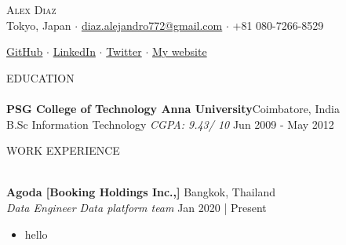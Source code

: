 \documentclass[letterpaper]{article}
\newcommand{\lineunder} {
    \vspace*{-8pt} \\
    \hspace*{-18pt} \hrulefill \\
}
\newcommand{\header} [1] {
    {\hspace*{-18pt}\vspace*{6pt} \textsc{#1}}
    \vspace*{-6pt} \lineunder
}
\begin{document}
\vspace*{-50pt}

    

\vspace*{-12pt}
\begin{center}
	{\Huge \scshape {Alex Diaz}}\\
	\vspace{1mm}
	\faMapMarker \hspace{.5mm} Tokyo, Japan $\cdot$ 
	\faEnvelope \hspace{.5mm} \href{mailto:diaz.alejandro772@gmail.com}{diaz.alejandro772@gmail.com} $\cdot$ \faMobile \hspace{.5mm} +81 080-7266-8529
		
	\faGithub \hspace{.5mm} \href{https://github.com/calmcoconut}{GitHub} $\cdot$
	\faLinkedin \hspace{.5mm} \href{https://www.linkedin.com/in/diazjalejandro/}{LinkedIn} $\cdot$
	\faTwitter \hspace{.5mm} \href{https://twitter.com/greetingsfriend}{Twitter} $\cdot$
    \faBriefcase \hspace{.5mm} \href{https://calmcoconut.github.io/Alejandro-Diaz-Portfolio/}{My website}
    \\
\end{center}

\header{EDUCATION}
\textbf{PSG College of Technology \textbar{} Anna University}\hfill Coimbatore, India\\
B.Sc Information Technology \textit{CGPA: 9.43/ 10} \hfill Jun 2009 - May 2012\\
\vspace*{12pt}

\header{WORK EXPERIENCE}
\vspace{1mm}

\textbf{Agoda [Booking Holdings Inc.,]} \hfill Bangkok, Thailand\\
\textit{Data Engineer \textbar{} Data platform team} \hfill Jan 2020 | Present\\
\vspace{-1.5mm}
\begin{itemize} \setlength\itemsep{-0.3em}
    \item hello
\end{itemize}
\end{document}

